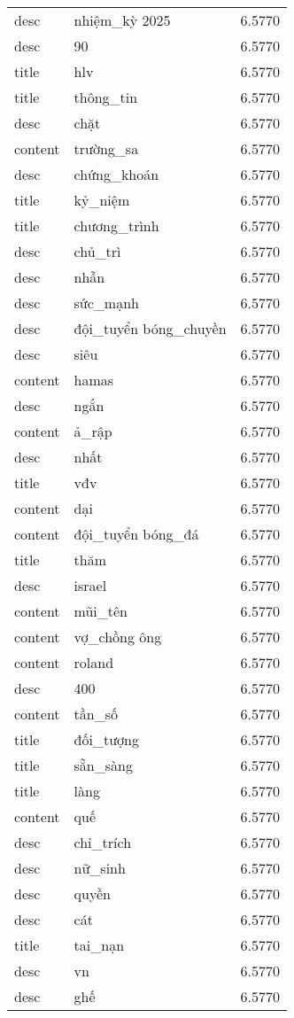 \documentclass{article}
\begin{document}
\begin{tabular}{lll}
desc & nhiệm\_kỳ 2025 & 6.5770\\
desc & 90 & 6.5770\\
title & hlv & 6.5770\\
title & thông\_tin & 6.5770\\
desc & chặt & 6.5770\\
content & trường\_sa & 6.5770\\
desc & chứng\_khoán & 6.5770\\
title & kỷ\_niệm & 6.5770\\
title & chương\_trình & 6.5770\\
desc & chủ\_trì & 6.5770\\
desc & nhẫn & 6.5770\\
desc & sức\_mạnh & 6.5770\\
desc & đội\_tuyển bóng\_chuyền & 6.5770\\
desc & siêu & 6.5770\\
content & hamas & 6.5770\\
desc & ngắn & 6.5770\\
content & ả\_rập & 6.5770\\
desc & nhất & 6.5770\\
title & vđv & 6.5770\\
content & dại & 6.5770\\
content & đội\_tuyển bóng\_đá & 6.5770\\
title & thăm & 6.5770\\
desc & israel & 6.5770\\
content & mũi\_tên & 6.5770\\
content & vợ\_chồng ông & 6.5770\\
content & roland & 6.5770\\
desc & 400 & 6.5770\\
content & tần\_số & 6.5770\\
title & đối\_tượng & 6.5770\\
title & sẵn\_sàng & 6.5770\\
title & làng & 6.5770\\
content & quế & 6.5770\\
desc & chỉ\_trích & 6.5770\\
desc & nữ\_sinh & 6.5770\\
desc & quyền & 6.5770\\
desc & cát & 6.5770\\
title & tai\_nạn & 6.5770\\
desc & vn & 6.5770\\
desc & ghế & 6.5770\\

\end{tabular}
\end{document}
